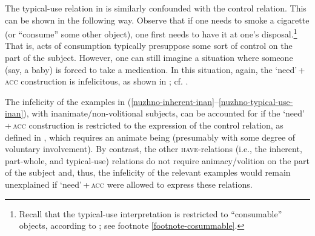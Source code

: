 \documentclass[output=paper]{langscibook}
\begin{document}
\noindent The typical-use relation in  is similarly confounded with the control relation. This can be shown in the following way. Observe that if one needs to smoke a cigarette (or ``consume'' some other object), one first needs to have it at one's disposal.\footnote{Recall that the typical-use interpretation is restricted to ``consumable'' objects, according to \citet{Zaroukian.Beller2013}; see footnote \ref{footnote-cosummable}.} That is, acts of consumption typically presuppose some sort of control on the part of the subject. However, one can still imagine a situation where someone (say, a baby) is forced to take a medication. In this situation, again, the `need'\,+\,\textsc{acc} construction is infelicitous, as shown in ; cf. .

\ea\judgewidth{\#} \label{typical-use-inan-context}
\z\z

\noindent The infelicity of the examples in (\ref{nuzhno-inherent-inan}--\ref{nuzhno-typical-use-inan}), with inanimate/non-volitional subjects, can be accounted for if the `need'\,+\,\textsc{acc} construction is restricted to the expression of the control relation, as defined in \citet{Vikner.Jensen2002}, which requires an animate being (presumably with some degree of voluntary involvement). By contrast, the other \textsc{have}-relations (i.e., the inherent, part-whole, and typical-use) relations do not require animacy/volition on the part of the subject and, thus, the infelicity of the relevant examples would remain unexplained if `need'\,+\,\textsc{acc} were allowed to express these relations.
\end{document}
